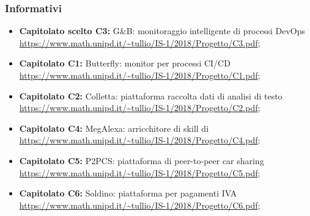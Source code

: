 		\subsubsection{Informativi}
		\begin{itemize}
			\item \textbf{Capitolato scelto C3:} G\&B: monitoraggio intelligente di processi DevOps \\ 
			\url{https://www.math.unipd.it/~tullio/IS-1/2018/Progetto/C3.pdf};
 			\item \textbf{Capitolato  C1:} Butterfly: monitor per processi CI/CD \\ \url{https://www.math.unipd.it/~tullio/IS-1/2018/Progetto/C1.pdf};
 			\item \textbf{Capitolato C2:} Colletta: piattaforma raccolta dati di analisi di testo \\ 
 			\url{https://www.math.unipd.it/~tullio/IS-1/2018/Progetto/C2.pdf};
 			\item \textbf{Capitolato C4:} MegAlexa: arricchitore di skill di  \\ \url{https://www.math.unipd.it/~tullio/IS-1/2018/Progetto/C4.pdf};
 			\item \textbf{Capitolato C5:} P2PCS: piattaforma di peer-to-peer car sharing \\ \url{https://www.math.unipd.it/~tullio/IS-1/2018/Progetto/C5.pdf};
 			\item \textbf{Capitolato C6:} Soldino: piattaforma  per pagamenti IVA \\ \url{https://www.math.unipd.it/~tullio/IS-1/2018/Progetto/C6.pdf};
 			
		\end{itemize}
		


